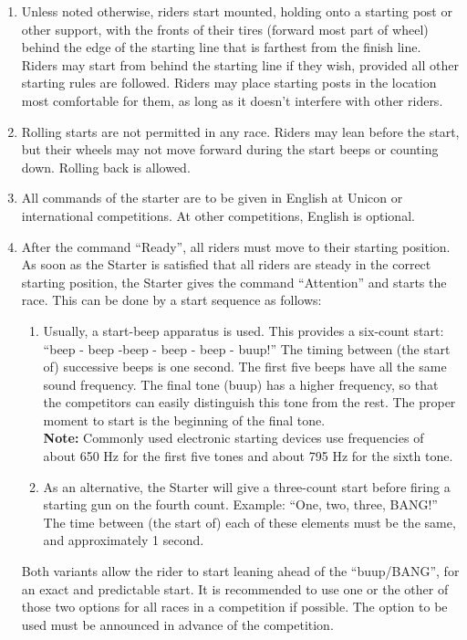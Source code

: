 \begin{enumerate}[leftmargin=1.5em,labelsep=*]
	\item Unless noted otherwise, riders start mounted, holding onto a starting post or other support, 
  with the fronts of their tires (forward most part of wheel) behind the edge of the starting line that is 
  farthest from the finish line.
	Riders may start from behind the starting line if they wish, provided all other starting rules are followed.
	Riders may place starting posts in the location most comfortable for them, as long as it doesn't interfere with other riders.
	
	\item Rolling starts are not permitted in any race.
	Riders may lean before the start, but their wheels may not move forward during the start beeps or counting down.
	Rolling back is allowed.
	
	\item All commands of the starter are to be given in English at Unicon or international competitions. 
  At other competitions, English is optional.
	
	\item After the command ``Ready'', all riders	must move to their starting position. 
  As soon as the Starter is satisfied that all riders are steady in the correct starting position, 
  the Starter gives the command ``Attention'' and starts the race.
	This can be done by a start sequence as follows:
	
	\begin{enumerate}[label*=\arabic*,leftmargin=1.5em,labelsep=*]
		\item Usually, a start-beep apparatus is used.
		This provides a six-count start: ``beep - beep -beep - beep - beep - buup!''
		The timing between (the start of) successive beeps is one second.
		The first five beeps have all the same sound frequency.
		The final tone (buup) has a higher frequency, so that the competitors can easily distinguish this tone from the rest. 
    The proper moment to start is the beginning of the final tone. \\
		\textbf{Note:} Commonly used electronic starting devices use frequencies of about 650 Hz for 
    the first five tones and about 795 Hz for the sixth tone.
		
		\item As an alternative, the Starter will give a three-count start before firing a starting gun on the fourth count.
		Example: ``One, two, three, BANG!''
		The time between (the start of) each of these elements must be the same, and approximately 1 second.
	\end{enumerate}
	Both variants allow the rider to start leaning ahead of the ``buup/BANG'', for an exact and predictable start.
	It is recommended to use one or the other of those two options for all races in a competition if possible. 
  The option to be used must be announced in advance of the competition.
	

\end{enumerate}
